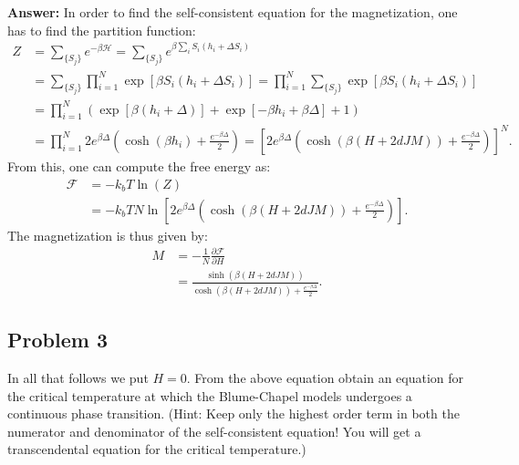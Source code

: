 \documentclass[a4paper]{article}
\newcommand{\newparagraph}{\vspace{.5cm}\noindent}
\begin{document}
\newparagraph
\textbf{Answer:} In order to find the self-consistent equation for the magnetization, one has to find the partition function:
\begin{align*}
    Z &= \sum_{\{S_j\}}e^{-\beta\mathcal{H}}= \sum_{\{S_j\}} e^{\beta\sum_i S_i(h_i + \Delta S_i)}\\
    &= \sum_{\{S_j\}} \prod_{i = 1}^N \exp\left[\beta S_i(h_i + \Delta S_i)\right]=  \prod_{i = 1}^N \sum_{\{S_j\}}\exp\left[\beta S_i(h_i + \Delta S_i)\right]\\
    &= \prod_{i = 1}^N \left(\exp\left[\beta( h_i + \Delta)\right]+\exp\left[-\beta h_i + \beta\Delta\right] + 1\right)\\
    &= \prod_{i = 1}^N 2e^{\beta \Delta }\left(\cosh(\beta h_i) + \frac{e^{-\beta \Delta}}{2}\right)= \left[2e^{\beta \Delta}\left(\cosh(\beta (H + 2dJM))+\frac{e^{-\beta \Delta}}{2}\right)\right]^N.
\end{align*}From this, one can compute the free energy as:
\begin{align*}
    \mathcal{F} &= -k_bT\ln(Z)\\
    &= -k_bTN\ln\left[2e^{\beta \Delta}\left(\cosh(\beta (H + 2dJM))+\frac{e^{-\beta \Delta}}{2}\right)\right].
\end{align*}The magnetization is thus given by:
\begin{align*}
    M &= - \frac{1}{N}\frac{\partial \mathcal{F}}{\partial H}\\
    &= \frac{\sinh(\beta (H + 2dJM))}{\cosh(\beta (H + 2dJM)) + \frac{e^{-\beta \Delta}}{2}}.
\end{align*}


\subsection*{Problem 3}
In all that follows we put $H = 0$. From the above equation obtain an equation for the critical temperature at which the Blume-Chapel models undergoes a continuous phase transition.
(Hint: Keep only the highest order term in both the numerator and denominator of the self-consistent equation! You will get a transcendental equation for the critical temperature.)
\end{document}

